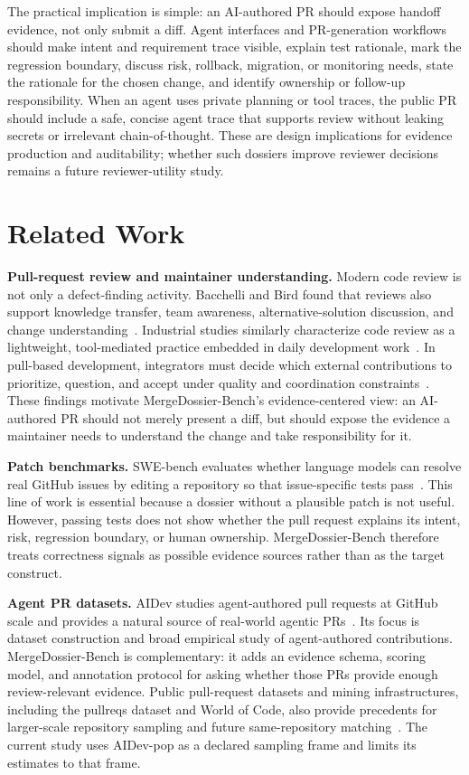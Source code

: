 \documentclass[10pt,conference]{IEEEtran}
\newcommand{\tool}{MergeDossier-Bench}
\begin{document}
The practical implication is simple: an AI-authored PR should expose handoff evidence, not only submit a diff.
Agent interfaces and PR-generation workflows should make intent and requirement trace visible, explain test rationale, mark the regression boundary, discuss risk, rollback, migration, or monitoring needs, state the rationale for the chosen change, and identify ownership or follow-up responsibility.
When an agent uses private planning or tool traces, the public PR should include a safe, concise agent trace that supports review without leaking secrets or irrelevant chain-of-thought.
These are design implications for evidence production and auditability; whether such dossiers improve reviewer decisions remains a future reviewer-utility study.

\section{Related Work}

\textbf{Pull-request review and maintainer understanding.}
Modern code review is not only a defect-finding activity.
Bacchelli and Bird found that reviews also support knowledge transfer, team awareness, alternative-solution discussion, and change understanding~\cite{bacchelliBird2013}.
Industrial studies similarly characterize code review as a lightweight, tool-mediated practice embedded in daily development work~\cite{sadowski2018GoogleReview}.
In pull-based development, integrators must decide which external contributions to prioritize, question, and accept under quality and coordination constraints~\cite{gousios2014PullBased,gousios2015Integrator}.
These findings motivate \tool{}'s evidence-centered view: an AI-authored PR should not merely present a diff, but should expose the evidence a maintainer needs to understand the change and take responsibility for it.

\textbf{Patch benchmarks.}
SWE-bench evaluates whether language models can resolve real GitHub issues by editing a repository so that issue-specific tests pass~\cite{swebench}.
This line of work is essential because a dossier without a plausible patch is not useful.
However, passing tests does not show whether the pull request explains its intent, risk, regression boundary, or human ownership.
\tool{} therefore treats correctness signals as possible evidence sources rather than as the target construct.

\textbf{Agent PR datasets.}
AIDev studies agent-authored pull requests at GitHub scale and provides a natural source of real-world agentic PRs~\cite{aidev}.
Its focus is dataset construction and broad empirical study of agent-authored contributions.
\tool{} is complementary: it adds an evidence schema, scoring model, and annotation protocol for asking whether those PRs provide enough review-relevant evidence.
Public pull-request datasets and mining infrastructures, including the pullreqs dataset and World of Code, also provide precedents for larger-scale repository sampling and future same-repository matching~\cite{gousios2014PullRequestsDataset,ma2021WorldOfCode}.
The current study uses AIDev-pop as a declared sampling frame and limits its estimates to that frame.
\end{document}
